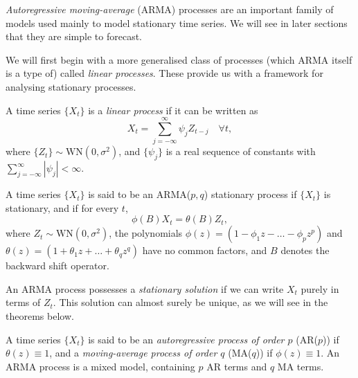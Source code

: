 \documentclass[a4paper, oneside]{discothesis}
\begin{document}
\textit{Autoregressive moving-average} (ARMA) processes are an important family of models used mainly to model stationary time series. We will see in later sections that they are simple to forecast.

We will first begin with a more generalised class of processes (which ARMA itself is a type of) called \textit{linear processes}. These provide us with a framework for analysing stationary processes.

\begin{definition}
    A time series $\{X_t\}$ is a \textit{linear process} if it can be written as
    \begin{equation}
        X_t = \sum_{j=-\infty}^\infty \psi_j Z_{t-j} \quad \forall t,
    \end{equation}
    where $\{Z_t\} \sim \mathrm{WN}(0, \sigma^2)$, and $\{\psi_j\}$ is a real sequence of constants with $\sum_{j=-\infty}^\infty |\psi_j| < \infty$.
\end{definition}

\begin{definition}
    A time series $\{X_t\}$ is said to be an ARMA($p,q$) stationary process if $\{X_t\}$ is stationary, and if for every $t$,
    \begin{equation} \label{eq:2.2}
        \phi(B) X_t = \theta(B) Z_t,
    \end{equation}
    where ${Z_t} \sim \text{WN}(0,\sigma^2)$, the polynomials $\phi(z) = (1-\phi_1z - \dots - \phi_p z^p)$ and $\theta(z) = (1 + \theta_1 z + \dots + \theta_q z^q)$ have no common factors, and $B$ denotes the backward shift operator.
\end{definition}

An ARMA process possesses a \textit{stationary solution} if we can write $X_t$ purely in terms of $Z_t$. This solution can almost surely be unique, as we will see in the theorems below.

\begin{definition}
    A time series $\{X_t\}$ is said to be an \textit{autoregressive process of order $p$} (AR($p$)) if $\theta(z) \equiv 1$, and a \textit{moving-average process of order $q$} (MA($q$)) if $\phi(z) \equiv 1$. An ARMA process is a mixed model, containing $p$ AR terms and $q$ MA terms.
\end{definition}
\end{document}

